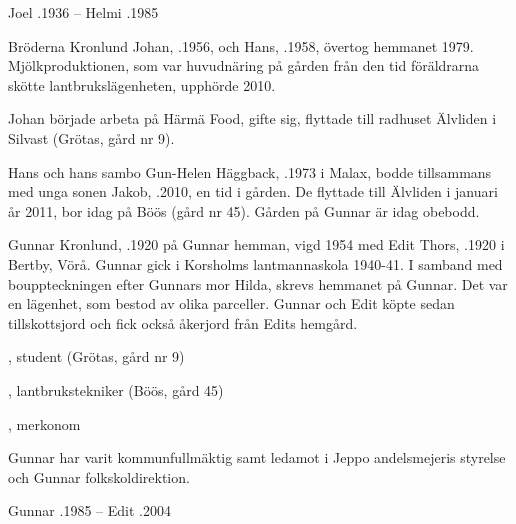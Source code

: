 Joel .1936  --  Helmi .1985




Bröderna Kronlund Johan, .1956, och Hans, .1958, övertog hemmanet 1979. Mjölkproduktionen, som var huvudnäring på gården från den tid föräldrarna skötte lantbrukslägenheten, upphörde 2010.

Johan började arbeta på Härmä Food, gifte sig, flyttade till radhuset Älvliden i Silvast (Grötas, gård nr 9).


Hans och hans sambo Gun-Helen Häggback, .1973 i Malax, bodde tillsammans med unga sonen Jakob, .2010, en tid i gården. De flyttade till Älvliden i januari år 2011, bor idag på Böös (gård nr 45). Gården på Gunnar är idag obebodd.


Gunnar Kronlund, .1920 på Gunnar hemman, vigd 1954 med Edit Thors, .1920 i Bertby, Vörå. Gunnar gick i Korsholms lantmannaskola 1940-41. I samband med bouppteckningen efter Gunnars mor Hilda, skrevs hemmanet på Gunnar. Det var en lägenhet, som bestod av olika parceller. Gunnar och Edit köpte sedan tillskottsjord och fick också åkerjord från Edits hemgård.
\begin{jhchildren}
  \item {}, student (Grötas, gård nr 9)
  \item {}, lantbrukstekniker (Böös, gård 45)
  \item {}, merkonom
\end{jhchildren}
Gunnar har varit kommunfullmäktig samt ledamot i Jeppo andelsmejeris styrelse och Gunnar folkskoldirektion.

Gunnar .1985  --  Edit .2004




